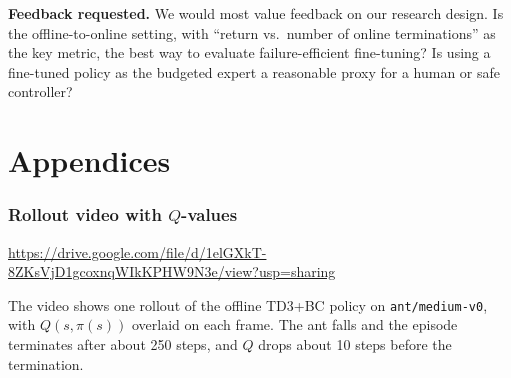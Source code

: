 \documentclass[11pt, letterpaper]{cmu}
\begin{document}
\textbf{Feedback requested.}
We would most value feedback on our research design. Is the offline-to-online setting, with
``return vs.\ number of online terminations'' as the key metric, the best way to evaluate
failure-efficient fine-tuning? Is using a fine-tuned policy as the budgeted expert a reasonable proxy
for a human or safe controller? 








\newpage
\appendix
\onecolumn
\part*{Appendices}

\section{Rollout video with $Q$-values}
\label{app:video}
\url{https://drive.google.com/file/d/1elGXkT-8ZKsVjD1gcoxnqWIkKPHW9N3e/view?usp=sharing}

The video shows one rollout of the offline TD3+BC policy on \texttt{ant/medium-v0}, with
$Q(s,\pi(s))$ overlaid on each frame. The ant falls and the episode terminates after about 250 steps,
and $Q$ drops about 10 steps before the termination.
\end{document}
